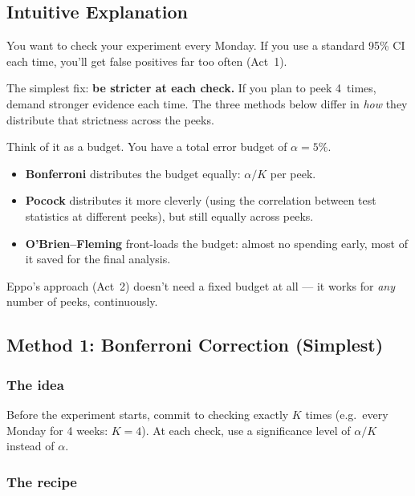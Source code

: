 \documentclass[12pt, a4paper]{article}
\begin{document}
\subsection{Intuitive Explanation}

\begin{intuition}
You want to check your experiment every Monday.  If you use a standard
95\% CI each time, you'll get false positives far too often (Act~1).

The simplest fix: \textbf{be stricter at each check.}  If you plan to peek
4~times, demand stronger evidence each time.  The three methods below
differ in \emph{how} they distribute that strictness across the peeks.

Think of it as a budget.  You have a total error budget of $\alpha = 5\%$.
\begin{itemize}[nosep]
  \item \textbf{Bonferroni} distributes the budget equally:
        $\alpha/K$ per peek.
  \item \textbf{Pocock} distributes it more cleverly (using the correlation
        between test statistics at different peeks), but still equally across
        peeks.
  \item \textbf{O'Brien--Fleming} front-loads the budget: almost no spending
        early, most of it saved for the final analysis.
\end{itemize}

Eppo's approach (Act~2) doesn't need a fixed budget at all --- it works
for \emph{any} number of peeks, continuously.
\end{intuition}


\subsection{Method 1: Bonferroni Correction (Simplest)}

\subsubsection*{The idea}

Before the experiment starts, commit to checking exactly $K$ times
(e.g.\ every Monday for 4 weeks: $K = 4$).  At each check, use a
significance level of $\alpha/K$ instead of $\alpha$.

\subsubsection*{The recipe}
\end{document}
